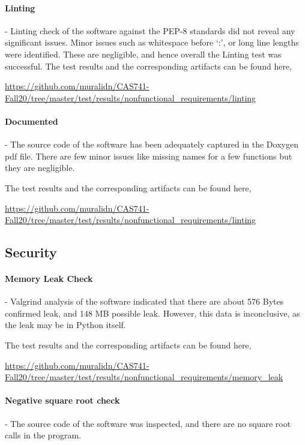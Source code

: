 \documentclass[12pt, titlepage]{article}
\begin{document}
\paragraph{Linting} - Linting check of the  \progname{} software against 
the PEP-8  standards did not reveal any significant issues. Minor issues such 
as whitespace before `:', or long line lengths were identified. These are 
negligible, and hence overall the Linting test was successful. The test results 
and the corresponding artifacts can be found here,

 \url{https://github.com/muralidn/CAS741-Fall20/tree/master/test/results/nonfunctional_requirements/linting}

\paragraph{Documented} - The source code of the \progname{} software has been 
adequately captured in the Doxygen pdf file. There are few minor issues like missing
 names for a few functions but they are negligible.

The test results and the corresponding artifacts can be found here,

 \url{https://github.com/muralidn/CAS741-Fall20/tree/master/test/results/nonfunctional_requirements/linting}

\subsection{Security}

\paragraph{Memory Leak Check} - Valgrind analysis of the \progname{} software indicated
that there are about 576 Bytes confirmed leak, and 148 MB possible leak. However, this 
data is inconclusive, as the leak may be in Python itself.

The test results and the corresponding artifacts can be found here,

 \url{https://github.com/muralidn/CAS741-Fall20/tree/master/test/results/nonfunctional_requirements/memory_leak}

\paragraph{Negative square root check} - The source code of the \progname{} software was 
inspected, and there are no square root calls in the program.
\end{document}
